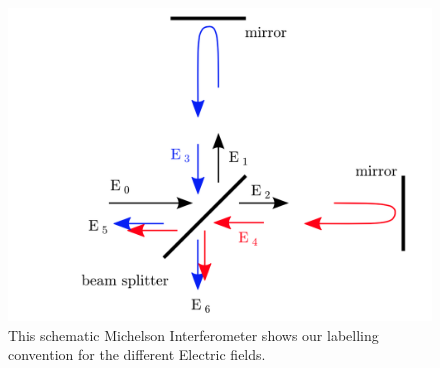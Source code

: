 \documentclass[11pt]{cuthesis}
\begin{document}
\begin{figure}[ht]
\centering
\includegraphics[width=12cm]{electric_fields} 
\caption{This schematic Michelson Interferometer shows our labelling convention for the different Electric fields. \cite{ifo_tech} }
\label{fig:ef}
\end{figure} 
\end{document}
